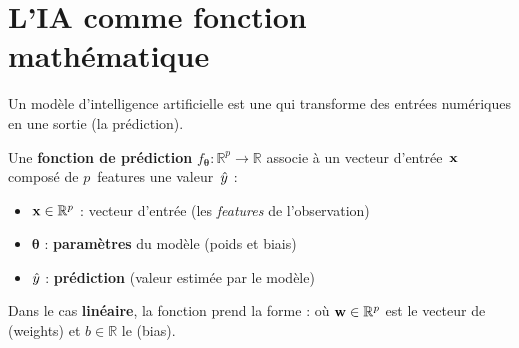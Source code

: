 %






\setlength{\parskip}{2pt}
\setlength{\abovedisplayskip}{6pt}
\setlength{\belowdisplayskip}{6pt}

\section{L'IA comme fonction math\'{e}matique}

Un mod\`{e}le d'intelligence artificielle est une  qui
transforme des entr\'{e}es num\'{e}riques en une sortie (la pr\'{e}diction).

\begin{definitionbox}
    Une \textbf{fonction de pr\'{e}diction} $f_{\boldsymbol{\theta}} : \mathbb{R}^p \to \mathbb{R}$
    associe \`{a} un vecteur d'entr\'{e}e~$\mathbf{x}$ compos\'{e} de $p$~features une valeur~$\hat{y}$ :
    \begin{itemize}
        \item $\mathbf{x} \in \mathbb{R}^p$ : vecteur d'entr\'{e}e (les \emph{features} de l'observation)
        \item $\boldsymbol{\theta}$ : \textbf{param\`{e}tres} du mod\`{e}le (poids et biais)
        \item $\hat{y}$ : \textbf{pr\'{e}diction} (valeur estim\'{e}e par le mod\`{e}le)
    \end{itemize}
\end{definitionbox}

Dans le cas \textbf{lin\'{e}aire}, la fonction prend la forme :
o\`{u} $\mathbf{w} \in \mathbb{R}^p$ est le vecteur de  (weights) et $b \in \mathbb{R}$ le  (bias).

